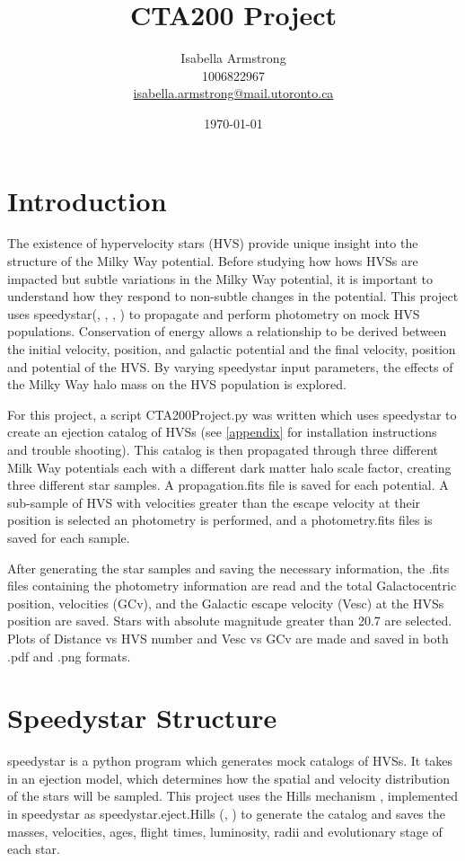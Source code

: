 \documentclass[12pt]{article}
\title{CTA200 Project}
\author{Isabella Armstrong \\ 1006822967\\
\href{mailto:isabella.armstrong@mail.utoronto.ca}{isabella.armstrong@mail.utoronto.ca}}
\date{\today}
\begin{document}
\maketitle
\section{Introduction}
The existence of hypervelocity stars (HVS) provide unique insight into the structure of the Milky Way potential. Before studying how hows HVSs are impacted but subtle variations in the Milky Way potential, it is important to understand how they respond to non-subtle changes in the potential. This project uses {\selectfont speedystar}(\cite{2017MNRAS.467.1844R}, \cite{2018MNRAS.476.4697M}, \cite{2019MNRAS.487.4025C}, \cite{2022MNRAS.517.3469E}) to propagate and perform photometry on mock HVS populations. Conservation of energy allows a relationship to be derived between the initial velocity, position, and galactic potential and the final velocity, position and potential of the HVS. By varying speedystar input parameters, the effects of the Milky Way halo mass on the HVS population is explored. \par 

For this project, a script {\selectfont CTA200Project.py} was written which uses {\selectfont speedystar} to create an ejection catalog of HVSs (see \ref{appendix} for installation instructions and trouble shooting). This catalog is then propagated through three different Milk Way potentials each with a different dark matter halo scale factor, creating three different star samples. A propagation.fits file is saved for each potential. A sub-sample of HVS with velocities greater than the escape velocity at their position is selected an photometry is performed, and a photometry.fits files is saved for each sample. \par 

After generating the star samples and saving the necessary information, the .fits files containing the photometry information are read and the total Galactocentric position, velocities (GCv), and the Galactic escape velocity (Vesc) at the HVSs position are saved. Stars with absolute magnitude greater than 20.7 are selected. Plots of Distance vs HVS number and  Vesc vs GCv are made and saved in both .pdf and .png formats.  

\section{Speedystar Structure}
{\selectfont speedystar} is a python program which generates mock catalogs of HVSs. It takes in an ejection model, which determines how the spatial and velocity distribution of the stars will be sampled. This project uses the Hills mechanism \cite{1988Natur.331..687H}, implemented in {\selectfont speedystar} as {\selectfont speedystar.eject.Hills} (\cite{2017MNRAS.467.1844R}, \cite{2018MNRAS.476.4697M}) to generate the catalog and saves the masses, velocities, ages, flight times, luminosity, radii and evolutionary stage of each star.
\end{document}
